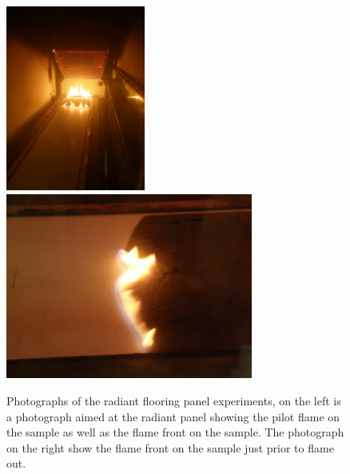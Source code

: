 \documentclass[twoside]{uocthesis}
\begin{document}
{\begin{figure}
	\centering
	\includegraphics[width=1.8in]{../Figures/FRP_Test_Photo1}
	\includegraphics[width=3.2in]{../Figures/FRP_Test_Photo2} \\
	\caption[Photographs of the radiant flooring panel experiments]{Photographs of the radiant flooring panel experiments, on the left is a photograph aimed at the radiant panel showing the pilot flame on the sample as well as the flame front on the sample.  The photograph on the right show the flame front on the sample just prior to flame out.}
	\label{FRP_Test_Photos}
\end{figure}

}
\end{document}
